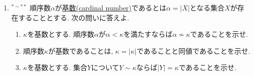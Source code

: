 \documentclass[dvipdfmx,a4paper,11pt]{article}
\theoremstyle{definition}
\begin{document}
\begin{enumerate}[label=\textbf{問}\ref*{sec-9}.\arabic*]
 $X$を集合として
$$
|X| = \min\{ \alpha \in OR  | \text{$X$にある順序$\le$があって$(X, \le)$と$(\alpha, \in)$は順序同型} \}
$$
 と定義し, $|X|$を$X$の\underline{濃度(cardinality)}という.\footnote{$\min$が存在するのは$OR$が整列クラスになることからわかる. $\min$の右側の集合が空でないことの証明は難しい. つまり「任意の整列集合はある順序数と順序同型になる」ことの証明は難しい. 詳しくは田中尚夫「公理的集合論」を参照のこと.}
 $X, Y$を集合とするとき, 次の問いに答えよ. 
 \begin{enumerate}[label=(\arabic*).]
 \setlength{\parskip}{0cm}
  \setlength{\itemsep}{0pt}
\item $X \sim Y$ であることは$|X| = |Y|$と同値であることを示せ.
\item 集合$\alpha$が順序数ならば, $|\alpha| \le \alpha$であることを示せ. 
\item $X \subset Y$ならば, $|X| \le |Y|$であることを示せ. 
\item 単射$f : X \to Y$が存在することは, $|X| \le |Y|$と同値であることを示せ. 
\end{enumerate}
 よって「$X$と$Y$の濃度が等しい」を$|X| = |Y|$と定義でき, 「$X$は$Y$より濃度が小さい」を$|X| < |Y|$として定義できる. 
 
 \item $^{* \sim **}$ 順序数$\alpha$が\underline{基数(cardinal number)}であるとは$\alpha=|X|$となる集合$X$が存在することとする. 
 次の問いに答えよ. 
  \begin{enumerate}[label=(\arabic*).]
 \setlength{\parskip}{0cm}
  \setlength{\itemsep}{0pt}
   \item $\kappa$を基数とする. 順序数$\alpha$が$\alpha < \kappa$を満たすならば$\alpha \not \sim \kappa$であることを示せ.
  \item 順序数$\kappa$が基数であることは, $\kappa = |\kappa|$であることと同値であることを示せ.
   \item $\kappa$を基数とする. 集合$Y$について$Y \sim \kappa$ならば$|Y|=\kappa$であることを示せ.
\end{enumerate}


\end{enumerate}
\end{document}
